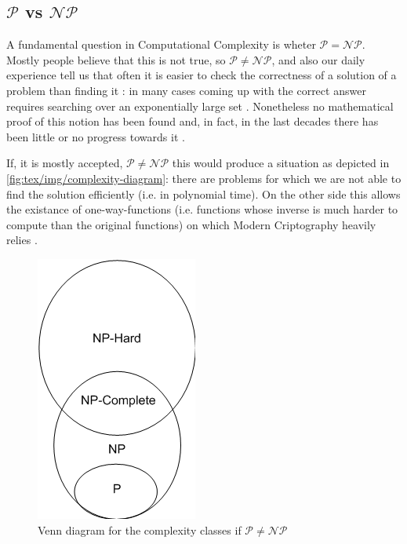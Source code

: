 \subsection{$\mathcal{P} $ vs $\mathcal{NP}$}%
\label{sub:_p_vs_np_}

A fundamental question in Computational Complexity is wheter $\mathcal{P} =
	\mathcal{NP} $. Mostly people believe that this is not true, so
$\mathcal{P} \neq \mathcal{NP} $, and also our daily experience tell us that
often it is easier to check the correctness of a solution of a problem than
finding it \cite{9780521884730}: in many cases coming up with the correct
answer requires searching over an exponentially large set
\cite{SanjeevArora2017}. Nonetheless no mathematical proof of this notion has
been found and, in fact, in the last decades there has been little or no progress towards it \cite{Erickson2019}.

If, it is mostly accepted, $\mathcal{P} \neq \mathcal{NP} $ this would produce
a situation as depicted in \autoref{fig:tex/img/complexity-diagram}:
there are problems for which we are not able to find the solution
efficiently (i.e. in polynomial time). On the other side this allows the
existance of one-way-functions (i.e. functions whose inverse is much harder to
compute than the original functions) on which Modern Criptography heavily
relies \cite{9780521884730}.
%


\begin{figure}
	\centering
	\includegraphics[width=0.3\linewidth]{tex/img/complexity-diagram.png}
	\caption[Complexity classes Venn diagram representation]{Venn diagram for the complexity classes if $\mathcal{P} \neq
			\mathcal{NP} $ \cite{article}}%
	\label{fig:tex/img/complexity-diagram}
\end{figure}

